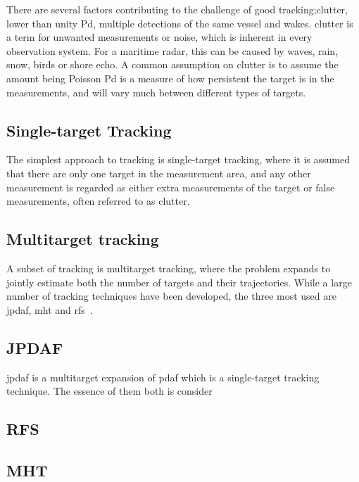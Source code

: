 There are several factors contributing to the challenge of good tracking;\gls{clutter}, lower than unity \gls{Pd}, multiple detections of the same vessel and wakes. \Gls{clutter} is a term for unwanted measurements or noise, which is inherent in every observation system. For a maritime radar, this can be caused by waves, rain, snow, birds or shore echo. A common assumption on clutter is to assume the amount being Poisson \gls{Pd} is a measure of how persistent the target is in the measurements, and will vary much  between different types of targets. 

\subsection{Single-target Tracking}
The simplest approach to tracking is single-target tracking, where it is assumed that there are only one target in the measurement area, and any other measurement is regarded as either extra measurements of the target or false measurements, often referred to as \gls{clutter}.

\subsection{Multitarget tracking}
A subset of tracking is multitarget tracking, where the problem expands to jointly estimate both the number of targets and their trajectories. While a large number of tracking techniques have been developed, the three most used are \gls{jpdaf}, \gls{mht} and \gls{rfs}~\cite{Vo2015}.

\subsection{JPDAF}
\gls{jpdaf} is a multitarget expansion of \gls{pdaf} which is a single-target tracking technique. The essence of them both is consider 

\subsection{RFS}

\subsection{MHT}